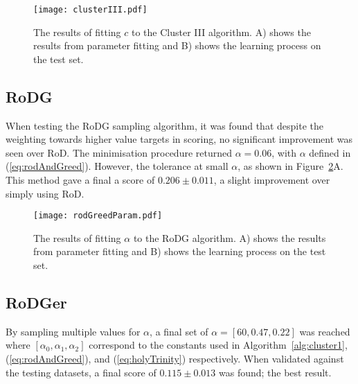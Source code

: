 \begin{figure}[H]
    \begin{center}
        \texttt{[image: clusterIII.pdf]}
        \caption[Cluster III]{The results of fitting $c$ to the Cluster III algorithm. A) shows the results from parameter fitting and B) shows the learning process on the test set.}
        \label{fig:clusterTest}
    \end{center}
\end{figure}

\subsection[Region of Disagreement with Greed]{RoDG}
When testing the RoDG sampling algorithm, it was found that despite the weighting towards higher value targets in scoring, no significant improvement was seen over RoD. The minimisation procedure returned ${\alpha{}=0.06}$, with $\alpha$ defined in (\ref{eq:rodAndGreed}). However, the tolerance at small $\alpha$, as shown in Figure~\ref{fig:rogreed}A. This method gave a final a score of ${0.206\pm{}0.011}$, a slight improvement over simply using RoD.

\begin{figure}[H]
    \begin{center}
        \texttt{[image: rodGreedParam.pdf]}
        \caption[RoD with Greed]{The results of fitting $\alpha{}$ to the RoDG algorithm. A) shows the results from parameter fitting and B) shows the learning process on the test set.}
        \label{fig:rogreed}
    \end{center}
\end{figure}

\subsection[Region of Disagreement with Greed and Clusters]{RoDGer}
By sampling multiple values for $\alpha$, a final set of $\alpha=[60, 0.47, 0.22]$ was reached where $[\alpha{}_0, \alpha{}_1, \alpha{}_2]$ correspond to the constants used in Algorithm~\ref{alg:cluster1}, (\ref{eq:rodAndGreed}), and (\ref{eq:holyTrinity}) respectively. When validated against the testing datasets, a final score of $0.115\pm{}0.013$ was found; the best result.

